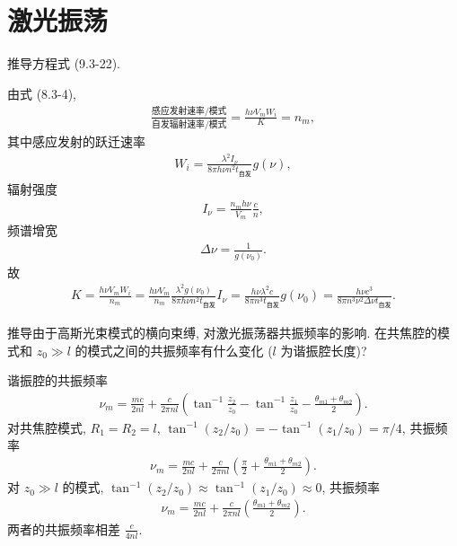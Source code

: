 \documentclass{note}
\begin{document}
\fi
\setcounter{chapter}{8}
\chapter{激光振荡}
\begin{exe}
    推导方程式 (9.3-22).
\end{exe}
\begin{pf}
    由式 (8.3-4),
    \begin{align}
        \frac{\text{感应发射速率}/\text{模式}}{\text{自发辐射速率}/\text{模式}}=\frac{h\nu V_mW_i}{K}=n_m,
    \end{align}
    其中感应发射的跃迁速率
    \begin{align}
        W_i=\frac{\lambda^2I_{\nu}}{8\pi h\nu n^2t_{\text{自发}}}g(\nu),
    \end{align}
    辐射强度
    \begin{align}
        I_{\nu}=\frac{n_mh\nu}{V_m}\frac{c}{n},
    \end{align}
    频谱增宽
    \begin{align}
        \Delta\nu=\frac{1}{g(\nu_0)}.
    \end{align}
    故
    \begin{align}
        K=\frac{h\nu V_mW_i}{n_m}=\frac{h\nu V_m}{n_m}\frac{\lambda^2g(\nu_0)}{8\pi h\nu n^2t_{\text{自发}}}I_{\nu}=\frac{h\nu\lambda^2c}{8\pi n^3t_{\text{自发}}}g(\nu_0)=\frac{h\nu c^3}{8\pi n^3\nu^2\Delta\nu t_{\text{自发}}}.
    \end{align}
\end{pf}

\begin{exe}
    推导由于高斯光束模式的横向束缚, 对激光振荡器共振频率的影响. 在共焦腔的模式和 $z_0\gg l$ 的模式之间的共振频率有什么变化 ($l$ 为谐振腔长度)?
\end{exe}
\begin{pf}
    谐振腔的共振频率
    \begin{align}
        \nu_m=\frac{mc}{2nl}+\frac{c}{2\pi nl}\left(\tan^{-1}\frac{z_2}{z_0}-\tan^{-1}\frac{z_1}{z_0}-\frac{\theta_{m1}+\theta_{m2}}{2}\right).
    \end{align}
    对共焦腔模式, $R_1=R_2=l$, $\tan^{-1}(z_2/z_0)=-\tan^{-1}(z_1/z_0)=\pi/4$, 共振频率
    \begin{align}
        \nu_m=\frac{mc}{2nl}+\frac{c}{2\pi nl}\left(\frac{\pi}{2}+\frac{\theta_{m1}+\theta_{m2}}{2}\right).
    \end{align}
    对 $z_0\gg l$ 的模式, $\tan^{-1}(z_2/z_0)\approx\tan^{-1}(z_1/z_0)\approx 0$, 共振频率
    \begin{align}
        \nu_m=\frac{mc}{2nl}+\frac{c}{2\pi nl}\left(\frac{\theta_{m1}+\theta_{m2}}{2}\right).
    \end{align}
    两者的共振频率相差 $\frac{c}{4nl}$.
\end{pf}
\end{document}

